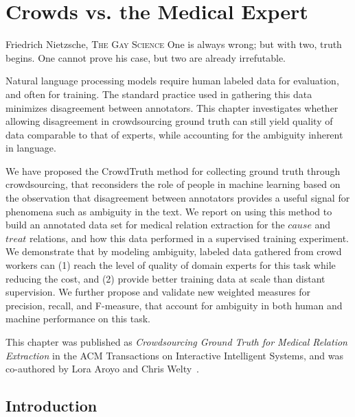 \chapter{Crowds vs. the Medical Expert}
\label{chap:med-rel-ex}

\begin{chapquote}{Friedrich Nietzsche, \textsc{The Gay Science}}
One is always wrong; but with two, truth begins. One cannot prove his case, but two are already irrefutable.
\end{chapquote}

Natural language processing models require human labeled data for evaluation, and often for training. The standard practice used in gathering this data minimizes disagreement between annotators. This chapter investigates whether allowing disagreement in crowdsourcing ground truth can still yield quality of data comparable to that of experts, while accounting for the ambiguity inherent in language.

We have proposed the CrowdTruth method for collecting ground truth through crowdsourcing, that reconsiders the role of people in machine learning based on the observation that disagreement between annotators provides a useful signal for phenomena such as ambiguity in the text. We report on using this method to build an annotated data set for medical relation extraction for the $cause$ and $treat$ relations, and how this data performed in a supervised training experiment. We demonstrate that by modeling ambiguity, labeled data gathered from crowd workers can (1) reach the level of quality of domain experts for this task while reducing the cost, and (2) provide better training data at scale than distant supervision. We further propose and validate new weighted measures for precision, recall, and F-measure, that account for ambiguity in both human and machine performance on this task.

This chapter was published as \textit{Crowdsourcing Ground Truth for Medical Relation Extraction} in the ACM Transactions on Interactive Intelligent Systems, and was co-authored by Lora Aroyo and Chris Welty~\cite{DBLP:journals/corr/DumitracheAW17}.


\section{Introduction}

